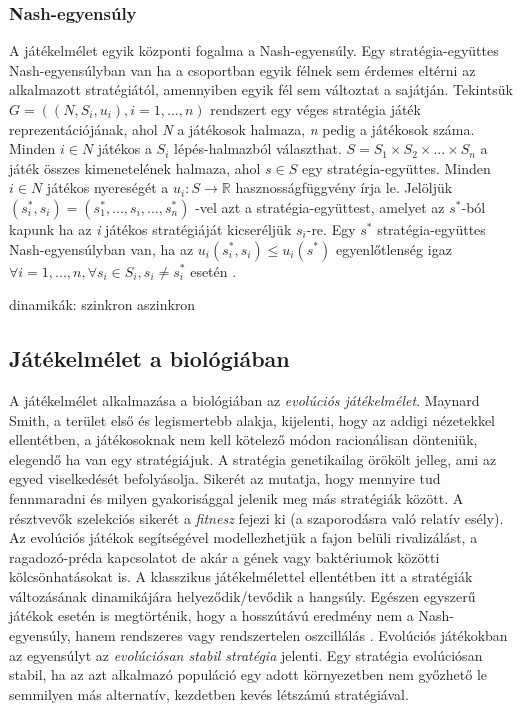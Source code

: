 \subsubsection{Nash-egyensúly}
A játékelmélet egyik központi fogalma a Nash-egyensúly. Egy stratégia-együttes Nash-egyensúlyban van ha a csoportban egyik félnek sem érdemes eltérni az alkalmazott stratégiától, amennyiben egyik fél sem változtat a sajátján. Tekintsük \(G = ((N,S_i,u_i), i = 1,...,n)\) rendszert egy véges stratégia játék reprezentációjának, ahol \textit{N} a játékosok halmaza, \textit{n} pedig a játékosok száma. Minden \(i \in N\) játékos a \(S_i\) lépés-halmazból választhat. \(S = S_1 \times S_2 \times ... \times S_n\)  a játék összes kimenetelének halmaza, ahol \(s \in S\) egy stratégia-együttes. Minden \(i \in N\) játékos nyereségét a \(u_i:S \to \mathbb{R}\) hasznosságfüggvény írja le. Jelöljük \((s_i^*,s_i) = (s^*_1,...,s_i,...,s_n^*)\) -vel azt a stratégia-együttest, amelyet az \(s^*\)-ból kapunk ha az \textit{i} játékos stratégiáját kicseréljük \(s_i\)-re. Egy \(s^*\) stratégia-együttes Nash-egyensúlyban van, ha az \(u_i(s_i^*,s_i)\leq u_i(s^*) \) egyenlőtlenség igaz \(\forall i = 1,...,n, \forall s_i \in S_i, s_i \ne s_i^*\) esetén \cite{nash1951non}.

dinamikák: szinkron aszinkron

\subsection{Játékelmélet a biológiában}
A játékelmélet alkalmazása a biológiában az \textit{evolúciós játékelmélet}. Maynard Smith, a terület első és legismertebb alakja, kijelenti, hogy az addigi nézetekkel ellentétben, a játékosoknak nem kell kötelező módon racionálisan dönteniük, elegendő ha van egy stratégiájuk. A stratégia genetikailag örökölt jelleg, ami az egyed viselkedését befolyásolja. Sikerét az mutatja, hogy mennyire tud fennmaradni és milyen gyakorisággal jelenik meg más stratégiák között. A résztvevők szelekciós sikerét a \textit{fitnesz} fejezi ki (a szaporodásra való relatív esély). Az evolúciós játékok segítségével modellezhetjük a fajon belüli rivalizálást, a ragadozó-préda kapcsolatot de akár a gének vagy baktériumok közötti kölcsönhatásokat is. A klasszikus játékelmélettel ellentétben itt a stratégiák változásának dinamikájára helyeződik/tevődik a hangsúly. Egészen egyszerű játékok esetén is megtörténik, hogy a hosszútávú eredmény nem a Nash-egyensúly, hanem rendszeres vagy rendszertelen oszcillálás \cite{nowak2004evolutionary}. Evolúciós játékokban az egyensúlyt az \textit{evolúciósan stabil stratégia} jelenti. Egy stratégia evolúciósan stabil, ha az azt alkalmazó populáció egy adott környezetben nem győzhető le semmilyen más alternatív, kezdetben kevés létszámú stratégiával.

